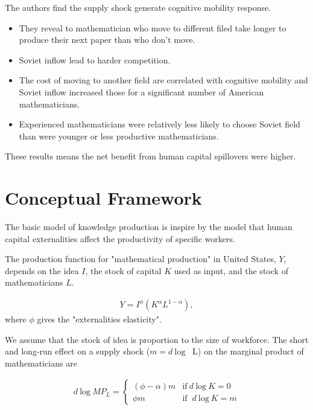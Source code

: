 \documentclass[../root]{subfiles}
\begin{document}
   
   The authors find the supply shock generate cognitive mobility response.
   \begin{itemize}
       \item They reveal to mathematician who move to different filed  take longer to produce their next paper than who don't move.
       \item Soviet inflow lead to harder competition.
       \item The cost of moving to another field are correlated with cognitive mobility and Soviet inflow increased those for a significant number of American mathematicians.  
       \item Experienced mathematicians were relatively less likely to choose Soviet field than were younger or less productive mathematicians. 
   \end{itemize}
   
   These results means the net benefit from human capital spillovers were higher.
   
    \section{Conceptual Framework}
    
    The basic model of knowledge production is inspire by the model that human capital externalities affect the productivity of specific workers.
    
    The production function for "mathematical production" in United States, $Y$, depends on the idea $I$, the stock of capital $K$ used as input, and the stock of mathematicians $L$. 
    
    \begin{align}
        Y=I^{\phi} (K^{\alpha}L^{1-\alpha}),
    \end{align}
    where $\phi$ gives the "externalities elasticity".
    
    We assume that the stock of idea is proportion to the size of workforce.
    The short  and long-run effect on a supply shock ($m=d \ \mbox{log}$ \ L) on the marginal product of mathematicians are 
    
    \begin{align}
        d \ \mbox{log} \ MP_L = 
            \begin{cases}
                (\phi - \alpha)m & \mbox{if}\ d\ \mbox{log} \ K=0 \\
                \phi m & \mbox{if }\ d\ \mbox{log} \ K =m
            \end{cases}
    \end{align}
    
\end{document}
